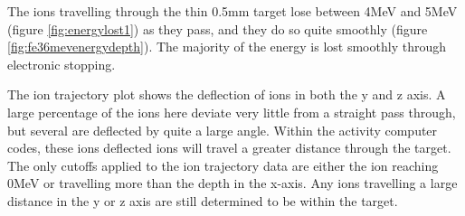 The ions travelling through the thin 0.5mm target lose between 4MeV and 5MeV (figure \ref{fig:energylost1}) as they pass, and they do so quite smoothly (figure \ref{fig:fe36mevenergydepth}).  The majority of the energy is lost smoothly through electronic stopping.  

The ion trajectory plot shows the deflection of ions in both the y and z axis.  A large percentage of the ions here deviate very little from a straight pass through, but several are deflected by quite a large angle.  Within the activity computer codes, these ions deflected ions will travel a greater distance through the target.  The only cutoffs applied to the ion trajectory data are either the ion reaching 0MeV or travelling more than the depth in the x-axis.  Any ions travelling a large distance in the y or z axis are still determined to be within the target.

